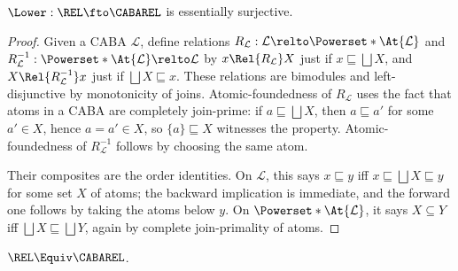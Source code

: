 \documentclass[a4paper,UKenglish,cleveref, autoref]{lipics-v2021}
\begin{document}
\begin{lemma}
  \label{lemma:lower-dense}
  \(\Lower : \REL \fto \CABAREL\) is essentially surjective.
\end{lemma}
\begin{proof}
  Given a CABA $\mathcal{L}$, define relations
  \(R_\mathcal{L} : \mathcal{L} \relto \Powerset*{\At{\mathcal{L}}}\) and
  \(R^{-1}_\mathcal{L} : \Powerset*{\At{\mathcal{L}}} \relto \mathcal{L}\) by
  \(x \Rel{R_\mathcal{L}} X\) just if \(x \sqsubseteq \bigsqcup X\), and
  \(X \Rel{R^{-1}_\mathcal{L}} x\) just if \(\bigsqcup X \sqsubseteq x\).
  These relations are bimodules and left-disjunctive by monotonicity of joins.
  Atomic-foundedness of \(R_\mathcal{L}\) uses the fact that atoms in a CABA are
  completely join-prime: if \(a \sqsubseteq \bigsqcup X\), then
  \(a \sqsubseteq a'\) for some \(a' \in X\), hence \(a = a' \in X\), so
  \(\{a\} \sqsubseteq X\) witnesses the property. Atomic-foundedness of
  \(R^{-1}_\mathcal{L}\) follows by choosing the same atom.

  Their composites are the order identities. On \(\mathcal{L}\), this says
  \(x \sqsubseteq y\) iff \(x \sqsubseteq \bigsqcup X \sqsubseteq y\) for some
  set \(X\) of atoms; the backward implication is immediate, and the forward
  one follows by taking the atoms below \(y\). On
  \(\Powerset*{\At{\mathcal{L}}}\), it says \(X \subseteq Y\) iff
  \(\bigsqcup X \sqsubseteq \bigsqcup Y\), again by complete join-primality of
  atoms.
\end{proof}

\begin{theorem}
  \label{theorem:cabarel-preduality}
  \(\REL \Equiv \CABAREL\).
\end{theorem}

\end{document}

